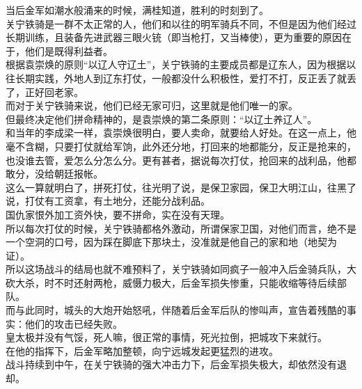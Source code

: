 \begin{multicols}{\theparacolNo}
当后金军如潮水般涌来的时候，满桂知道，胜利的时刻到了。\\

关宁铁骑是一群不太正常的人，他们和以往的明军骑兵不同，不但是因为他们经过长期训练，且装备先进武器三眼火铳（即当枪打，又当棒使），更为重要的原因在于，他们是既得利益者。\\

根据袁崇焕的原则“以辽人守辽土”，关宁铁骑的主要成员都是辽东人，因为根据以往长期实践，外地人到辽东打仗，一般都没什么积极性，爱打不打，反正丢了就丢了，正好回老家。\\

而对于关宁铁骑来说，他们已经无家可归，这里就是他们唯一的家。\\

但最终决定他们拼命精神的，是袁崇焕的第二条原则：“以辽土养辽人”。\\

和当年的李成梁一样，袁崇焕很明白，要人卖命，就要给人好处。在这一点上，他毫不含糊，只要打仗就给军饷，此外还分地，打回来的地都能分，反正是抢来的，也没谁去管，爱怎么分怎么分。更有甚者，据说每次打仗，抢回来的战利品，他都敢分，没给朝廷报帐。\\

这么一算就明白了，拼死打仗，往光明了说，是保卫家园，保卫大明江山，往黑了说，打仗有工资拿，有土地分，还能分战利品。\\

国仇家恨外加工资外快，要不拼命，实在没有天理。\\

所以每次打仗的时候，关宁铁骑都格外激动，所谓保家卫国，对他们而言，绝不是一个空洞的口号，因为踩在脚底下那块土，没准就是他自己的家和地（地契为证）。\\

所以这场战斗的结局也就不难预料了，关宁铁骑如同疯子一般冲入后金骑兵队，大砍大杀，时不时还射两枪，威慑力极大，后金军损失惨重，只能收缩等待后续部队。\\

而与此同时，城头的大炮开始怒吼，伴随着后金军后队的惨叫声，宣告着残酷的事实：他们的攻击已经失败。\\

皇太极并没有气馁，死人嘛，很正常的事情，死光拉倒，把城攻下来就行。\\

在他的指挥下，后金军略加整顿，向宁远城发起更猛烈的进攻。\\

战斗持续到中午，在关宁铁骑的强大冲击力下，后金军损失极大，却依然没有退却。\\


\end{multicols}
